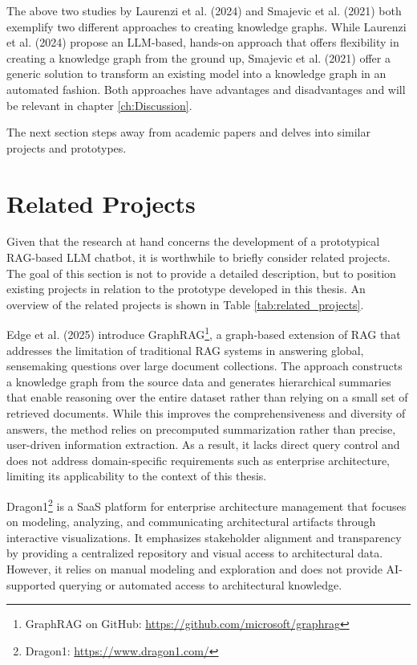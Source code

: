 The above two studies by Laurenzi et al. (2024) \cite{laurenzi2024llm} and Smajevic et al. (2021) \cite{smajevic2021conceptual} both exemplify two different approaches to creating knowledge graphs. While Laurenzi et al. (2024) propose an LLM-based, hands-on approach that offers flexibility in creating a knowledge graph from the ground up, Smajevic et al. (2021) offer a generic solution to transform an existing model into a knowledge graph in an automated fashion. Both approaches have advantages and disadvantages and will be relevant in chapter \ref{ch:Discussion}.

The next section steps away from academic papers and delves into similar projects and prototypes.

\section{Related Projects}
\label{sec:intro:projects}
Given that the research at hand concerns the development of a prototypical RAG-based LLM chatbot, it is worthwhile to briefly consider related projects. The goal of this section is not to provide a detailed description, but to position existing projects in relation to the prototype developed in this thesis. An overview of the related projects is shown in Table \ref{tab:related_projects}.

Edge et al. (2025) \cite{MsGraphRAGPaper} introduce GraphRAG\footnote{GraphRAG on GitHub: \url{https://github.com/microsoft/graphrag}}, a graph-based extension of RAG that addresses the limitation of traditional RAG systems in answering global, sensemaking questions over large document collections. The approach constructs a knowledge graph from the source data and generates hierarchical summaries that enable reasoning over the entire dataset rather than relying on a small set of retrieved documents. While this improves the comprehensiveness and diversity of answers, the method relies on precomputed summarization rather than precise, user-driven information extraction. As a result, it lacks direct query control and does not address domain-specific requirements such as enterprise architecture, limiting its applicability to the context of this thesis.

Dragon1\footnote{Dragon1: \url{https://www.dragon1.com/}} \cite{Dragon1BusinessCase} is a SaaS platform for enterprise architecture management that focuses on modeling, analyzing, and communicating architectural artifacts through interactive visualizations. It emphasizes stakeholder alignment and transparency by providing a centralized repository and visual access to architectural data. However, it relies on manual modeling and exploration and does not provide AI-supported querying or automated access to architectural knowledge.

